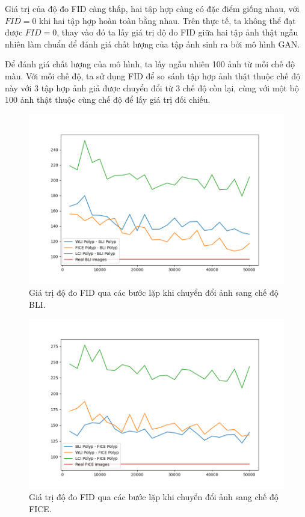 \documentclass[12pt]{extreport}
\begin{document}
Giá trị của độ đo FID càng thấp, hai tập hợp càng có đặc điểm giống nhau, với $ FID = 0 $ khi hai tập hợp hoàn toàn bằng nhau. Trên thực tế, ta không thể đạt được $ FID = 0 $, thay vào đó ta lấy giá trị độ đo FID giữa hai tập ảnh thật ngẫu nhiên làm chuẩn để đánh giá chất lượng của tập ảnh sinh ra bởi mô hình GAN.

Để đánh giá chất lượng của mô hình, ta lấy ngẫu nhiên 100 ảnh từ mỗi chế độ màu. Với mỗi chế độ, ta sử dụng FID để so sánh tập hợp ảnh thật thuộc chế độ này với 3 tập hợp ảnh giả được chuyển đổi từ 3 chế độ còn lại, cùng với một bộ 100 ảnh thật thuộc cùng chế độ để lấy giá trị đối chiếu.

\begin{figure}[H]
    \centering
    \includegraphics[width=\linewidth]{fid/FID_BLI.png}
    \caption{Giá trị độ đo FID qua các bước lặp khi chuyển đổi ảnh sang chế độ BLI.}
\end{figure}

\begin{figure}[H]
    \centering
    \includegraphics[width=\linewidth]{fid/FID_FICE.png}
    \caption{Giá trị độ đo FID qua các bước lặp khi chuyển đổi ảnh sang chế độ FICE.}
\end{figure}
\end{document}
